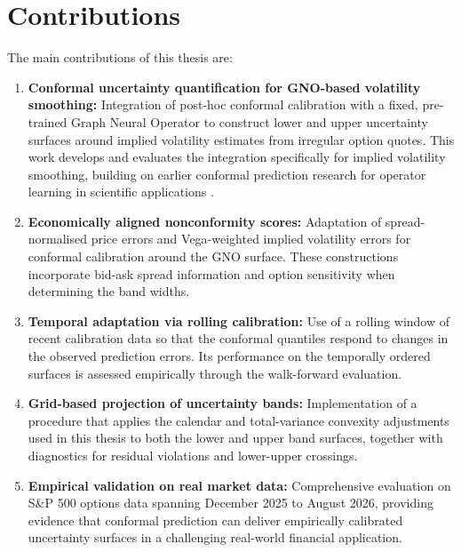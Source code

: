 \section{Contributions}
\label{sec:contributions}

The main contributions of this thesis are:

\begin{enumerate}
    \item \textbf{Conformal uncertainty quantification for GNO-based volatility smoothing:} Integration of post-hoc conformal calibration with a fixed, pre-trained Graph Neural Operator to construct lower and upper uncertainty surfaces around implied volatility estimates from irregular option quotes. This work develops and evaluates the integration specifically for implied volatility smoothing, building on earlier conformal prediction research for operator learning in scientific applications \cite{ma2024calibrated}.

    \item \textbf{Economically aligned nonconformity scores:} Adaptation of spread-normalised price errors and Vega-weighted implied volatility errors for conformal calibration around the GNO surface. These constructions incorporate bid-ask spread information and option sensitivity when determining the band widths.

    \item \textbf{Temporal adaptation via rolling calibration:} Use of a rolling window of recent calibration data so that the conformal quantiles respond to changes in the observed prediction errors. Its performance on the temporally ordered surfaces is assessed empirically through the walk-forward evaluation.

    \item \textbf{Grid-based projection of uncertainty bands:} Implementation of a procedure that applies the calendar and total-variance convexity adjustments used in this thesis to both the lower and upper band surfaces, together with diagnostics for residual violations and lower-upper crossings.

    \item \textbf{Empirical validation on real market data:} Comprehensive evaluation on S\&P 500 options data spanning December 2025 to August 2026, providing evidence that conformal prediction can deliver empirically calibrated uncertainty surfaces in a challenging real-world financial application.
\end{enumerate}

